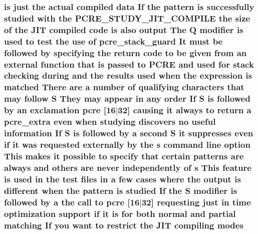 \subsubsection[{\texorpdfstring{modes}{modes}}]{ {\bf is} just the actual {\bf compiled} {\bf data} If the {\bf pattern} {\bf is} successfully {\bf studied} {\bf with} the {\bf P\+C\+R\+E\+\_\+\+S\+T\+U\+D\+Y\+\_\+\+J\+I\+T\+\_\+\+C\+O\+M\+P\+I\+LE} the {\bf size} {\bf of} the J\+IT {\bf compiled} {\bf code} {\bf is} also {\bf output} The Q {\bf modifier} {\bf is} {\bf used} {\bf to} test the use {\bf of} {\bf pcre\+\_\+stack\+\_\+guard} It must {\bf be} followed by {\bf specifying} the return {\bf code} {\bf to} {\bf be} {\bf given} {\bf from} an external {\bf function} that {\bf is} passed {\bf to} {\bf P\+C\+RE} and {\bf used} for {\bf stack} checking during and the {\bf results} {\bf used} when the {\bf expression} {\bf is} {\bf matched} There {\bf are} {\bf a} {\bf number} {\bf of} qualifying {\bf characters} that may follow {\bf S} They may appear {\bf in} {\bf any} {\bf order} If {\bf S} {\bf is} followed by an exclamation {\bf pcre} \mbox{[}16$\vert$32\mbox{]} causing {\bf it} always {\bf to} return {\bf a} {\bf pcre\+\_\+extra} even when {\bf studying} discovers no useful information If {\bf S} {\bf is} followed by {\bf a} {\bf second} {\bf S} {\bf it} suppresses even {\bf if} {\bf it} was requested externally by the {\bf s} {\bf command} {\bf line} {\bf option} This makes {\bf it} {\bf possible} {\bf to} specify that certain {\bf patterns} {\bf are} always and others {\bf are} never independently {\bf of} {\bf s} This {\bf feature} {\bf is} {\bf used} {\bf in} the test {\bf files} {\bf in} {\bf a} few {\bf cases} {\bf where} the {\bf output} {\bf is} different when the {\bf pattern} {\bf is} {\bf studied} If the {\bf S} {\bf modifier} {\bf is} followed by {\bf a} the call {\bf to} {\bf pcre} \mbox{[}16$\vert$32\mbox{]} requesting just {\bf in} {\bf time} optimization {\bf support} {\bf if} {\bf it} {\bf is} for both normal and {\bf partial} {\bf matching} If you want {\bf to} restrict the J\+IT {\bf compiling} modes}\hypertarget{pcretest_8txt_a3a5a5e9fe38b920f7eb3a06306c82767}{}\label{pcretest_8txt_a3a5a5e9fe38b920f7eb3a06306c82767}
